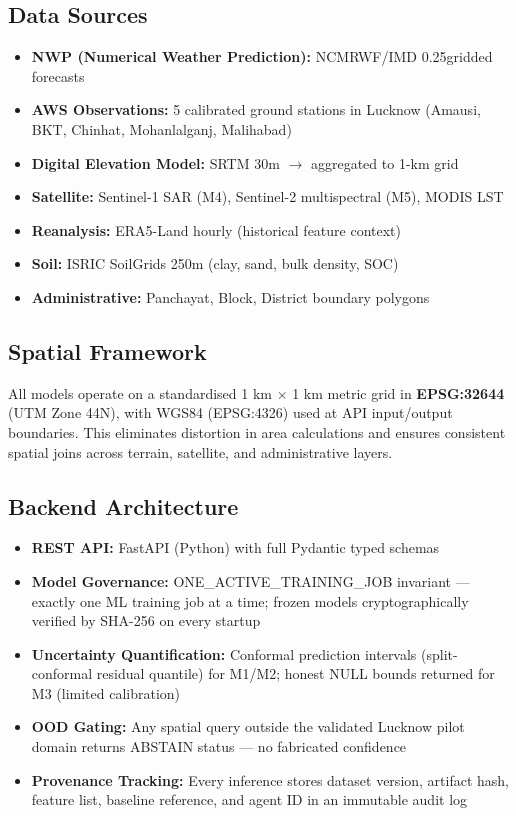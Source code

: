 \documentclass[12pt,a4paper]{article}
\begin{document}
\subsection{Data Sources}

\begin{itemize}[leftmargin=*]
  \item \textbf{NWP (Numerical Weather Prediction):} NCMRWF/IMD 0.25\textdegree  gridded forecasts
  \item \textbf{AWS Observations:} 5 calibrated ground stations in Lucknow (Amausi, BKT, Chinhat, Mohanlalganj, Malihabad)
  \item \textbf{Digital Elevation Model:} SRTM 30m $\rightarrow$ aggregated to 1-km grid
  \item \textbf{Satellite:} Sentinel-1 SAR (M4), Sentinel-2 multispectral (M5), MODIS LST
  \item \textbf{Reanalysis:} ERA5-Land hourly (historical feature context)
  \item \textbf{Soil:} ISRIC SoilGrids 250m (clay, sand, bulk density, SOC)
  \item \textbf{Administrative:} Panchayat, Block, District boundary polygons
\end{itemize}

\subsection{Spatial Framework}

All models operate on a standardised 1 km $\times$ 1 km metric grid in \textbf{EPSG:32644} (UTM Zone 44N), with WGS84 (EPSG:4326) used at API input/output boundaries. This eliminates distortion in area calculations and ensures consistent spatial joins across terrain, satellite, and administrative layers.

\subsection{Backend Architecture}

\begin{itemize}[leftmargin=*]
  \item \textbf{REST API:} FastAPI (Python) with full Pydantic typed schemas
  \item \textbf{Model Governance:} ONE\_ACTIVE\_TRAINING\_JOB invariant --- exactly one ML training job at a time; frozen models cryptographically verified by SHA-256 on every startup
  \item \textbf{Uncertainty Quantification:} Conformal prediction intervals (split-conformal residual quantile) for M1/M2; honest NULL bounds returned for M3 (limited calibration)
  \item \textbf{OOD Gating:} Any spatial query outside the validated Lucknow pilot domain returns ABSTAIN status --- no fabricated confidence
  \item \textbf{Provenance Tracking:} Every inference stores dataset version, artifact hash, feature list, baseline reference, and agent ID in an immutable audit log
\end{itemize}
\end{document}
